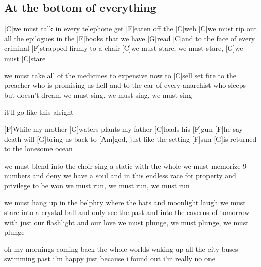 \subsection*{At the bottom of everything   }
\begin{guitar}

[C]we must talk in every telephone get [F]eaten off the [C]web
[C]we must rip out all the epilogues in the [F]books that we have [G]read 
[C]and to the face of every criminal [F]strapped firmly to a chair
[C]we must stare, we must stare, [G]we must [C]stare

we must take all of the medicines to expensive now to [C]sell
set fire to the preacher who is promising us hell
and to the ear of every anarchist who sleeps but doesn't dream
we must sing, we must sing, we must sing



it'll go like this alright



[F]While my mother [G]waters plants my father [C]loads his [F]gun
[F]he say death will [G]bring us back to [Am]god, just like the setting [F]sun
[G]is returned to the lonesome ocean






we must blend into the choir sing a static with the whole
we must memorize 9 numbers and deny we have a soul
and in this endless race for property and privilege to be won
we must run, we must run, we must run

we must hang up in the belphry where the bats and moonlight laugh
we must stare into a crystal ball and only see the past
and into the caverns of tomorrow with just our flashlight and our love
we must plunge, we must plunge, we must plunge



oh my mornings coming back the whole worlds waking up
all the city buses swimming past i'm happy just because 
i found out i'm really no one


\end{guitar}

